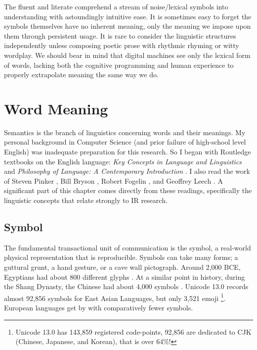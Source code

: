 The fluent and literate comprehend a stream of noise\slash lexical symbols into understanding with astoundingly intuitive ease. It is sometimes easy to forget the symbols themselves have no inherent meaning, only the meaning we impose upon them through persistent usage. It is rare to consider the linguistic structures independently unless composing poetic prose with rhythmic rhyming or witty wordplay. We should bear in mind that digital machines see only the lexical form of words, lacking both the cognitive programming and human experience to properly extrapolate meaning the same way we do.






\section{Word Meaning}

Semantics is the branch of linguistics concerning words and their meanings. My personal background in Computer Science (and prior failure of high-school level English) was inadequate preparation for this research. So I began with Routledge textbooks on the English language: \textit{Key Concepts in Language and Linguistics} \cite{trask1999key} and \textit{Philosophy of Language: A Contemporary Introduction} \cite{lycan2018philosophy}. I also read the work of Steven Pinker \cite{pinker2003language, pinker2007stuff, pinker2015words}, Bill Bryson \cite{bryson1990mother}, Robert Fogelin \cite{fogelin2011figuratively}, and Geoffrey Leech \cite{leech2014linguistic}. A significant part of this chapter comes directly from these readings, specifically the linguistic concepts that relate strongly to IR research.

\subsection{Symbol}

The fundamental transactional unit of communication is the symbol, a real-world physical representation that is reproducible. Symbols can take many forms; a guttural grunt, a hand gesture, or a cave wall pictograph. Around 2,000 BCE, Egyptians had about 800 different glyphs \cite{loprieno1995ancient}. At a similar point in history, during the Shang Dynasty, the Chinese had about 4,000 symbols \cite{baxter2014old}. Unicode 13.0 records almost 92,856 symbols for East Asian Languages, but only 3,521 emoji \cite{unicode13}\footnote{Unicode 13.0 has 143,859 registered code-points, 92,856 are dedicated to CJK (Chinese, Japanese, and Korean), that is over 64\%!}. European languages get by with comparatively fewer symbols.

